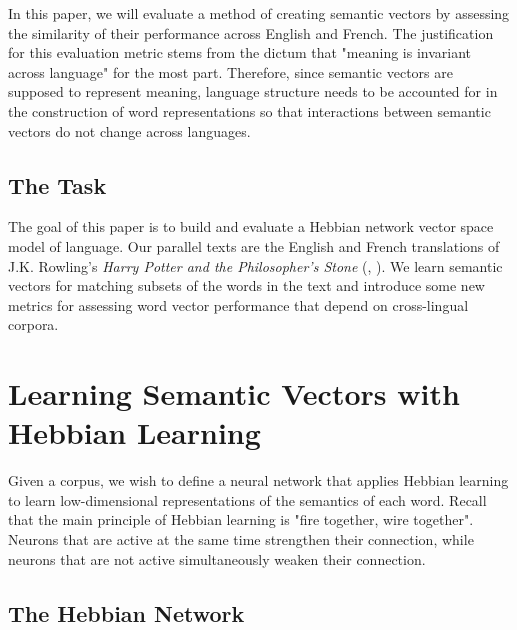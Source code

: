 \documentclass[12pt, usenames]{article}
\theoremstyle{definition}
\theoremstyle{definition}
\theoremstyle{definition}
\begin{document}
In this paper, we will evaluate a method of creating semantic vectors by assessing the similarity of their performance across English and French. The justification for this evaluation metric stems from the dictum that "meaning is invariant across language" for the most part. Therefore, since semantic vectors are supposed to represent meaning, language structure needs to be accounted for in the construction of word representations so that interactions between semantic vectors do not change across languages. 


\subsection{The Task} %

The goal of this paper is to build and evaluate a Hebbian network vector space model of language. 
Our parallel texts are the English and French translations of J.K. Rowling's \textit{Harry Potter and the Philosopher's Stone} (\cite{RowlingEn}, \cite{RowlingFr}). We learn semantic vectors for matching subsets of the words in the text and introduce some new metrics for assessing word vector performance that depend on cross-lingual corpora.


\section{Learning Semantic Vectors with Hebbian Learning}
\label{sec:Section2}

Given a corpus, we wish to define a neural network that applies Hebbian learning to learn low-dimensional representations of the semantics of each word. Recall that the main principle of Hebbian learning is "fire together, wire together". Neurons that are active at the same time strengthen their
connection, while neurons that are not active simultaneously weaken their connection.

\subsection{The Hebbian Network}
\end{document}
